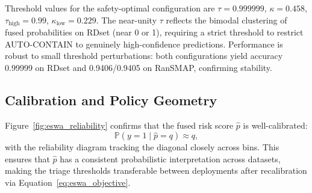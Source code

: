 \begin{table}[ht]
\centering
\caption{Fusion and triage performance under safety-optimal and low-escalation policies.}
\label{tab:eswa_triage}
\end{table}

Threshold values for the safety-optimal configuration are $\tau = 0.999999$, $\kappa = 0.458$, $\tau_\text{high} = 0.99$, $\kappa_\text{low} = 0.229$. The near-unity $\tau$ reflects the bimodal clustering of fused probabilities on RDset (near 0 or 1), requiring a strict threshold to restrict AUTO-CONTAIN to genuinely high-confidence predictions. Performance is robust to small threshold perturbations: both configurations yield accuracy 0.99999 on RDset and 0.9406/0.9405 on RanSMAP, confirming stability.

\subsection{Calibration and Policy Geometry}

Figure~\ref{fig:eswa_reliability} confirms that the fused risk score $\hat{p}$ is well-calibrated:
\begin{equation}
\mathbb{P}(y = 1 \mid \hat{p} = q) \approx q,
\end{equation}
with the reliability diagram tracking the diagonal closely across bins. This ensures that $\hat{p}$ has a consistent probabilistic interpretation across datasets, making the triage thresholds transferable between deployments after recalibration via Equation~\eqref{eq:eswa_objective}.


